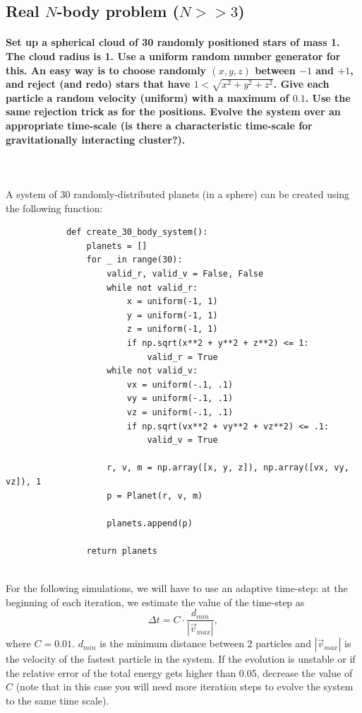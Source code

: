 \newpage
\subsection{Real $N$-body problem ($N>>3$)}
    \paragraph{Set up a spherical cloud of 30 randomly positioned stars of 
        mass 1. The cloud radius is 1. Use a uniform random number generator 
        for this. An easy way is to choose randomly $(x,y,z)$ between 
        $-1$ and $+1$, and reject (and redo) stars that have 
        $1<\sqrt{x^2+y^2+z^2}$. Give each particle a random velocity
        (uniform) with a maximum of $0.1$. Use the same rejection trick as for 
        the positions. Evolve the system over an appropriate time-scale 
        (is there a characteristic time-scale for gravitationally interacting
        cluster?). 
    } \ \\
        \\
        A system of 30 randomly-distributed planets (in a sphere) can 
        be created using the following function:
        \begin{lstlisting}
            def create_30_body_system():
                planets = []
                for _ in range(30):
                    valid_r, valid_v = False, False
                    while not valid_r:
                        x = uniform(-1, 1)
                        y = uniform(-1, 1)
                        z = uniform(-1, 1)
                        if np.sqrt(x**2 + y**2 + z**2) <= 1:
                            valid_r = True
                    while not valid_v:
                        vx = uniform(-.1, .1)
                        vy = uniform(-.1, .1)
                        vz = uniform(-.1, .1)
                        if np.sqrt(vx**2 + vy**2 + vz**2) <= .1:
                            valid_v = True
            
                    r, v, m = np.array([x, y, z]), np.array([vx, vy, vz]), 1
                    p = Planet(r, v, m)
            
                    planets.append(p)
            
                return planets \end{lstlisting} \ \\
        For the following simulations, we will have to use an adaptive 
        time-step: at the beginning of each iteration, we estimate the 
        value of the time-step as 
        \begin{equation}
            \Delta t = C\cdot\frac{d_{min}}{|\vec v_{max}|},
        \end{equation}
        where $C=0.01$. $d_{min}$ is the minimum distance between 2 particles 
        and $|\vec v_{max}|$ is the velocity of the fastest particle in the 
        system. If the evolution is unstable or if the relative error of the 
        total energy gets higher than 0.05, decrease the value of $C$ (note 
        that in this case you will need more iteration steps to evolve the 
        system to the same time scale).

